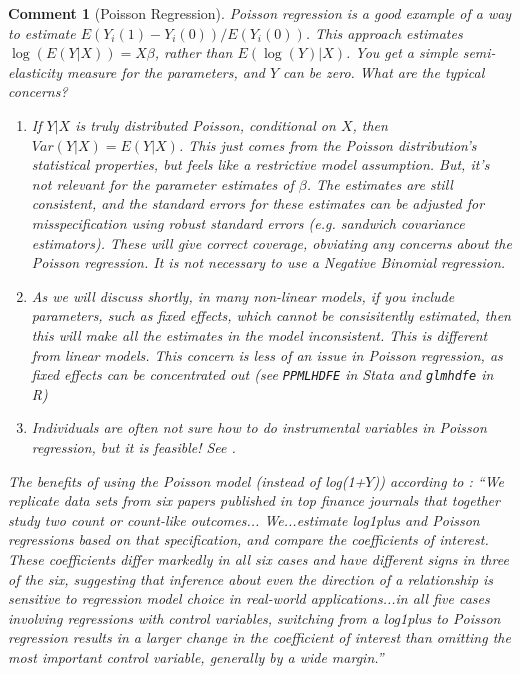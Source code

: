 \documentclass{tufte-handout}
\theoremstyle{break}
\newtheorem{cmt}{Comment}
\begin{document}
  \begin{boxF}
\begin{cmt}[Poisson Regression]
  Poisson regression is a good example of a way to estimate $E(Y_{i}(1) - Y_{i}(0)) / E(Y_{i}(0))$. This approach estimates $\log(E(Y|X)) = X\beta$, rather than $E(\log(Y)|X)$. You get a simple semi-elasticity measure for the parameters, and $Y$ can be zero. What are the typical concerns?
        \begin{enumerate}
        \item       If $Y | X$ is truly distributed
        Poisson, conditional on $X$, then $Var(Y|X) = E(Y|X)$. This just comes from the Poisson
        distribution's statistical properties, but feels like a restrictive model assumption. But, it's not relevant for the parameter estimates of $\beta$. The estimates are still consistent, and the standard errors for these estimates can be adjusted for misspecification using robust standard errors (e.g. sandwich covariance estimators). These will give correct coverage, obviating any concerns about the Poisson regression. It is \emph{not} necessary to use a Negative Binomial regression.
      \item As we will discuss shortly, in many non-linear models, if you include parameters, such as fixed effects, which cannot be consisitently estimated, then this will make \emph{all} the estimates in the model inconsistent. This is different from linear models. This concern is less of an issue in Poisson regression, as fixed effects can be concentrated out (see \texttt{PPMLHDFE} in Stata and \texttt{glmhdfe} in R)
      \item Individuals are often not sure how to do instrumental variables in Poisson regression, but it is feasible! See \citet{mullahy1997instrumental, windmeijer1997endogeneity}.
      \end{enumerate}

  
The benefits of using the Poisson model (instead of log(1+$Y$)) according to \citet{cohn2022count}:
``We replicate data sets from six papers published in top finance journals that together study two count or count-like outcomes... We...estimate log1plus and Poisson regressions based on that specification, and compare the coefficients of interest. These coefficients differ markedly in all six cases and have different signs in three of the six, suggesting that inference about even the direction of a relationship is sensitive to regression model choice in real-world applications...in all five cases involving regressions with control variables, switching from a log1plus to Poisson regression results in a larger change in the coefficient of interest than omitting the most important control variable, generally by a wide margin.''
    \end{cmt}
  \end{boxF}
  
\end{document}
